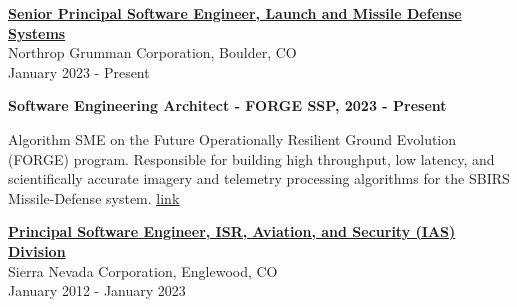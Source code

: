 \documentclass[10pt]{article}
\newenvironment{outerlist}[1][\enskip\textbullet]%
        {\begin{itemize}[#1]}{\end{itemize}%
         \vspace{-.6\baselineskip}}
\newenvironment{innerlist}[1][\enskip\textbullet]%
        {\begin{compactitem}[#1]}{\end{compactitem}}
\begin{document}
\href{http://northropgrumman.com}{
    \textbf{Senior Principal Software Engineer, Launch and Missile Defense Systems}}\\
    Northrop Grumman Corporation, Boulder, CO\\
    January 2023 - Present
    \begin{outerlist}
        \item \textbf{Software Engineering Architect - FORGE SSP, 2023 - Present}\\
        \begin{innerlist}
            \item Algorithm SME on the Future Operationally Resilient Ground Evolution (FORGE) program.  
                  Responsible for building high throughput, low latency, and scientifically accurate imagery and telemetry processing algorithms
                  for the SBIRS Missile-Defense system. \href{https://scitec.com/scitec-inc-awarded-45-8-million-contract-for-continued-development-of-forge-legacy-sbirs-ssp/}{\underline{link}}\\
        \end{innerlist}
    \end{outerlist}
\href{http://www.sncorp.com}{
     \textbf{Principal Software Engineer, ISR, Aviation, and Security (IAS) Division}}\\
     Sierra Nevada Corporation, Englewood, CO\\
     January 2012 - January 2023
\end{document}
